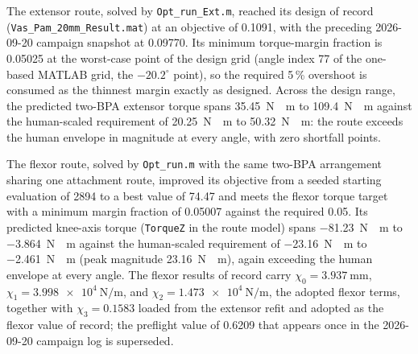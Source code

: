 The extensor route, solved by \texttt{Opt\_run\_Ext.m}, reached its design of record (\texttt{Vas\_Pam\_20mm\_Result.mat}) at an objective of 0.1091, with the preceding 2026-09-20 campaign snapshot at 0.09770. Its minimum torque-margin fraction is 0.05025 at the worst-case point of the design grid (angle index 77 of the one-based MATLAB grid, the $-20.2^{\circ}$ point), so the required 5\,\% overshoot is consumed as the thinnest margin exactly as designed. Across the design range, the predicted two-BPA extensor torque spans \qty{35.45}{\newton\cdot\meter} to \qty{109.4}{\newton\cdot\meter} against the human-scaled requirement of \qty{20.25}{\newton\cdot\meter} to \qty{50.32}{\newton\cdot\meter}: the route exceeds the human envelope in magnitude at every angle, with zero shortfall points.

The flexor route, solved by \texttt{Opt\_run.m} with the same two-BPA arrangement sharing one attachment route, improved its objective from a seeded starting evaluation of 2894 to a best value of 74.47 and meets the flexor torque target with a minimum margin fraction of 0.05007 against the required 0.05. Its predicted knee-axis torque (\texttt{TorqueZ} in the route model) spans \qty{-81.23}{\newton\cdot\meter} to \qty{-3.864}{\newton\cdot\meter} against the human-scaled requirement of \qty{-23.16}{\newton\cdot\meter} to \qty{-2.461}{\newton\cdot\meter} (peak magnitude \qty{23.16}{\newton\cdot\meter}), again exceeding the human envelope at every angle. The flexor results of record carry $\chi_{0} = \qty{+3.937}{\mm}$, $\chi_{1} = \qty{3.998e4}{\N\per\m}$, and $\chi_{2} = \qty{1.473e4}{\N\per\m}$, the adopted flexor terms, together with $\chi_{3} = 0.1583$ loaded from the extensor refit and adopted as the flexor value of record; the preflight value of 0.6209 that appears once in the 2026-09-20 campaign log is superseded.


